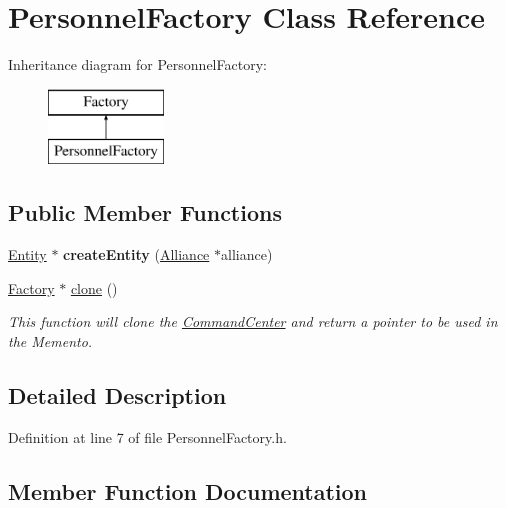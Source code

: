 \hypertarget{classPersonnelFactory}{}\section{Personnel\+Factory Class Reference}
\label{classPersonnelFactory}
Inheritance diagram for Personnel\+Factory\+:\begin{figure}[H]
\begin{center}
\leavevmode
\includegraphics[height=2.000000cm]{classPersonnelFactory}
\end{center}
\end{figure}
\subsection*{Public Member Functions}
\begin{DoxyCompactItemize}
\item 
\mbox{\label{classPersonnelFactory_ae8684c246d5dfb1f469f368525867394}} 
\hyperlink{classEntity}{Entity} $\ast$ {\bfseries create\+Entity} (\hyperlink{classAlliance}{Alliance} $\ast$alliance)
\item 
\hyperlink{classFactory}{Factory} $\ast$ \hyperlink{classPersonnelFactory_ad60e8371e52153294112b16a7a97cc2d}{clone} ()
\begin{DoxyCompactList}\small\item\em This function will clone the \hyperlink{classCommandCenter}{Command\+Center} and return a pointer to be used in the Memento. \end{DoxyCompactList}\end{DoxyCompactItemize}


\subsection{Detailed Description}


Definition at line 7 of file Personnel\+Factory.\+h.



\subsection{Member Function Documentation}
\mbox{\label{classPersonnelFactory_ad60e8371e52153294112b16a7a97cc2d}} 
